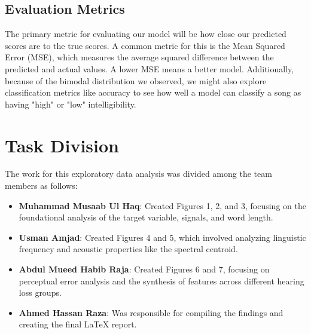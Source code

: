 \documentclass[conference]{IEEEtran}
\begin{document}
\subsection{Evaluation Metrics}
The primary metric for evaluating our model will be how close our predicted scores are to the true scores. A common metric for this is the Mean Squared Error (MSE), which measures the average squared difference between the predicted and actual values. A lower MSE means a better model. Additionally, because of the bimodal distribution we observed, we might also explore classification metrics like accuracy to see how well a model can classify a song as having "high" or "low" intelligibility.

\section{Task Division}
The work for this exploratory data analysis was divided among the team members as follows:
\begin{itemize}
    \item \textbf{Muhammad Musaab Ul Haq}: Created Figures 1, 2, and 3, focusing on the foundational analysis of the target variable, signals, and word length.
    \item \textbf{Usman Amjad}: Created Figures 4 and 5, which involved analyzing linguistic frequency and acoustic properties like the spectral centroid.
    \item \textbf{Abdul Mueed Habib Raja}: Created Figures 6 and 7, focusing on perceptual error analysis and the synthesis of features across different hearing loss groups.
    \item \textbf{Ahmed Hassan Raza}: Was responsible for compiling the findings and creating the final LaTeX report.
\end{itemize}
\end{document}
